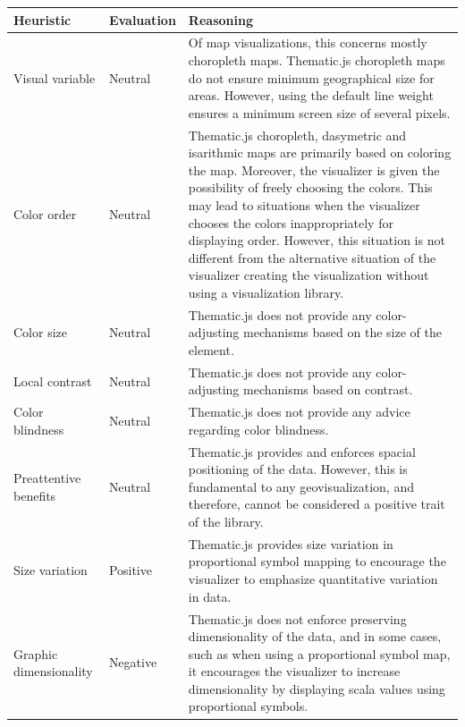 \begin{longtable}{|p{3cm}|p{2.2cm}|p{7.8cm}|}
\hline
\textbf{Heuristic} & \textbf{Evaluation} & \textbf{Reasoning} \\ 
\hline
Visual variable & Neutral & Of map visualizations, this concerns mostly choropleth maps. Thematic.js choropleth maps do not ensure minimum geographical size for areas. However, using the default line weight ensures a minimum screen size of several pixels. \\[0.5em] %
Color order & Neutral & Thematic.js choropleth, dasymetric and isarithmic maps are primarily based on coloring the map. Moreover, the visualizer is given the possibility of freely choosing the colors. This may lead to situations when the visualizer chooses the colors inappropriately for displaying order. However, this situation is not different from the alternative situation of the visualizer creating the visualization without using a visualization library. \\[0.5em] %
Color size & Neutral & Thematic.js does not provide any color-adjusting mechanisms based on the size of the element. \\[0.5em] %
Local contrast & Neutral & Thematic.js does not provide any color-adjusting mechanisms based on contrast. \\[0.5em] %
Color blindness & Neutral & Thematic.js does not provide any advice regarding color blindness. \\[0.5em] %
Preattentive benefits & Neutral & Thematic.js provides and enforces spacial positioning of the data. However, this is fundamental to any geovisualization, and therefore, cannot be considered a positive trait of the library. \\[0.5em] %
Size variation & Positive & Thematic.js provides size variation in proportional symbol mapping to encourage the visualizer to emphasize quantitative variation in data. \\[0.5em] %
Graphic dimensionality & Negative & Thematic.js does not enforce preserving dimensionality of the data, and in some cases, such as when using a proportional symbol map, it encourages the visualizer to increase dimensionality by displaying scala values using proportional symbols. \\[0.5em] %

\end{longtable}
